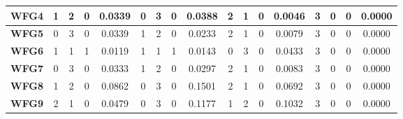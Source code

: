 \begin{table*}[t]
{\begin{tabular}{c|c|c|c|c|c|c|c|c|c|c|c|c|c|c|c|c|}
\multicolumn{1}{|c|}{\textbf{WFG4}}  & 1                   & 2                     & 0                          & 0.0339          & 0                   & 3                     & 0                          & 0.0388          & 2                   & 1                     & 0                          & 0.0046          & 3                   & 0                     & 0                          & 0.0000          \\ \hline
\multicolumn{1}{|c|}{\textbf{WFG5}}  & 0                   & 3                     & 0                          & 0.0339          & 1                   & 2                     & 0                          & 0.0233          & 2                   & 1                     & 0                          & 0.0079          & 3                   & 0                     & 0                          & 0.0000          \\ \hline
\multicolumn{1}{|c|}{\textbf{WFG6}}  & 1                   & 1                     & 1                          & 0.0119          & 1                   & 1                     & 1                          & 0.0143          & 0                   & 3                     & 0                          & 0.0433          & 3                   & 0                     & 0                          & 0.0000          \\ \hline
\multicolumn{1}{|c|}{\textbf{WFG7}}  & 0                   & 3                     & 0                          & 0.0333          & 1                   & 2                     & 0                          & 0.0297          & 2                   & 1                     & 0                          & 0.0083          & 3                   & 0                     & 0                          & 0.0000          \\ \hline
\multicolumn{1}{|c|}{\textbf{WFG8}}  & 1                   & 2                     & 0                          & 0.0862          & 0                   & 3                     & 0                          & 0.1501          & 2                   & 1                     & 0                          & 0.0692          & 3                   & 0                     & 0                          & 0.0000          \\ \hline
\multicolumn{1}{|c|}{\textbf{WFG9}}  & 2                   & 1                     & 0                          & 0.0479          & 0                   & 3                     & 0                          & 0.1177          & 1                   & 2                     & 0                          & 0.1032          & 3                   & 0                     & 0                          & 0.0000          \\ \hline

\end{tabular}}
\end{table*}
